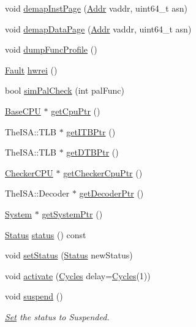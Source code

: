 \begin{DoxyCompactItemize}
\item 
void \hyperlink{classSimpleThread_ac8a36d45a839b07f50b73f1eee119615}{demapInstPage} (\hyperlink{base_2types_8hh_af1bb03d6a4ee096394a6749f0a169232}{Addr} vaddr, uint64\_\-t asn)
\item 
void \hyperlink{classSimpleThread_a26789603cc94992d18f8ddedfff96acf}{demapDataPage} (\hyperlink{base_2types_8hh_af1bb03d6a4ee096394a6749f0a169232}{Addr} vaddr, uint64\_\-t asn)
\item 
void \hyperlink{classSimpleThread_a13fa12d1779a94a1e0b968946a1367c7}{dumpFuncProfile} ()
\item 
\hyperlink{classRefCountingPtr}{Fault} \hyperlink{classSimpleThread_a5f42e07ae335dff417664e91518c7f1e}{hwrei} ()
\item 
bool \hyperlink{classSimpleThread_a461205960be9d52e9beda48a77e9c600}{simPalCheck} (int palFunc)
\item 
\hyperlink{classBaseCPU}{BaseCPU} $\ast$ \hyperlink{classSimpleThread_a4f35ce7d5cb2ec57504bc2c2bc03c879}{getCpuPtr} ()
\item 
TheISA::TLB $\ast$ \hyperlink{classSimpleThread_a95b7e95d0558cd03d69613142fff9137}{getITBPtr} ()
\item 
TheISA::TLB $\ast$ \hyperlink{classSimpleThread_a2fe6a07c44bc2a4d83b86bea605ba971}{getDTBPtr} ()
\item 
\hyperlink{classCheckerCPU}{CheckerCPU} $\ast$ \hyperlink{classSimpleThread_a0807ebbe39e158fdf6007ca00e3f7252}{getCheckerCpuPtr} ()
\item 
TheISA::Decoder $\ast$ \hyperlink{classSimpleThread_a6ae33963bc5f8b515f0a50c483f21c7f}{getDecoderPtr} ()
\item 
\hyperlink{classSystem}{System} $\ast$ \hyperlink{classSimpleThread_af7bdb56e0088b380302741ad9008f321}{getSystemPtr} ()
\item 
\hyperlink{classThreadContext_a67a0db04d321a74b7e7fcfd3f1a3f70b}{Status} \hyperlink{classSimpleThread_a2ad9e92a82d6f783b3061584729c2f4a}{status} () const 
\item 
void \hyperlink{classSimpleThread_a1ab41c7c20554bc6a9205b5b69d30406}{setStatus} (\hyperlink{classThreadContext_a67a0db04d321a74b7e7fcfd3f1a3f70b}{Status} newStatus)
\item 
void \hyperlink{classSimpleThread_ab542a5cf9ce4b41042d61e42dfe3aeab}{activate} (\hyperlink{classCycles}{Cycles} delay=\hyperlink{classCycles}{Cycles}(1))
\item 
void \hyperlink{classSimpleThread_a3605b58fb45d69d498721bc2f2a14b1c}{suspend} ()
\begin{DoxyCompactList}\small\item\em \hyperlink{classSet}{Set} the status to Suspended. \item\end{DoxyCompactList}\item 

\end{DoxyCompactItemize}
